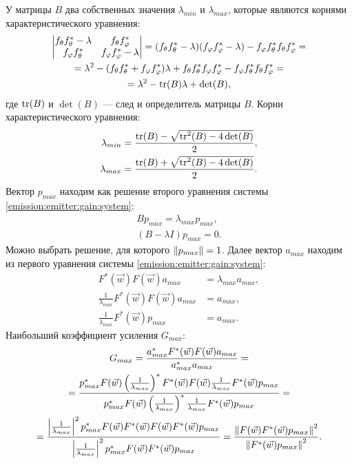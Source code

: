 У матрицы $B$ два собственных значения $\lambda_{min}$ и $\lambda_{max}$, которые являются корнями характеристического уравнения:
\begin{multline*}
    \begin{vmatrix}
        f_\theta f_\theta^* - \lambda & f_{\theta} f_\varphi^*          \\
        f_\varphi f_\theta^*          & f_\varphi f_\varphi^* - \lambda
    \end{vmatrix}
    = (f_\theta f_\theta^* - \lambda) (f_\varphi f_\varphi^* - \lambda) - f_\varphi f_\theta^* f_{\theta} f_\varphi^* = \\
    = \lambda^2 - ( f_\theta f_\theta^* + f_\varphi f_\varphi^* ) \lambda + f_\theta f_\theta^* f_\varphi f_\varphi^* - f_\varphi f_\theta^* f_{\theta} f_\varphi^* = \\
    = \lambda^2 - \operatorname{tr}(B) \lambda + \det(B) ,
\end{multline*}
где $\operatorname{tr}(B)$ и $\det(B)$ --- след и определитель матрицы $B$. Корни характеристического уравнения:
\begin{align}
    \lambda_{min} & = \frac{\operatorname{tr}(B) - \sqrt{\operatorname{tr}^2(B) - 4 \det(B)}}{2} \label{emission:emitter:gain:minimum_eigenvalue} , \\
    \lambda_{max} & = \frac{\operatorname{tr}(B) + \sqrt{\operatorname{tr}^2(B) - 4 \det(B)}}{2} \label{emission:emitter:gain:maximum_eigenvalue}.
\end{align}
Вектор $p_{max}$ находим как решение второго уравнения системы \eqref{emission:emitter:gain:system}:
\begin{gather*}
    B p_{max} = \lambda_{max} p_{max} , \\
    ( B - \lambda I ) p_{max} = 0 .
\end{gather*}
Можно выбрать решение, для которого $\left \| p_{max} \right \| = 1$. Далее вектор $a_{max}$ находим из первого уравнения системы \eqref{emission:emitter:gain:system}:
\begin{align*}
    F^*(\vec{w}) F(\vec{w}) a_{max}                         & = \lambda_{max} a_{max} , \\
    \frac{1}{\lambda_{max}} F^*(\vec{w}) F(\vec{w}) a_{max} & = a_{max} , \\
    \frac{1}{\lambda_{max}} F^*(\vec{w}) p_{max}            & = a_{max} .
\end{align*}
Наибольший коэффициент усиления $G_{max}$:
\begin{multline*}
    G_{max}
    = \frac{a_{max}^* F^*(\vec{w}) F(\vec{w}) a_{max}}{a_{max}^* a_{max}} = \\
    = \frac{p_{max}^* F(\vec{w}) \left ( \frac{1}{\lambda_{max}} \right )^* F^*(\vec{w}) F(\vec{w}) \frac{1}{\lambda_{max}} F^*(\vec{w}) p_{max}}{ p_{max}^* F(\vec{w}) \left ( \frac{1}{\lambda_{max}} \right )^* \frac{1}{\lambda_{max}} F^*(\vec{w}) p_{max}} = \\
    = \frac{\left | \frac{1}{\lambda_{max}} \right |^2 p_{max}^* F(\vec{w}) F^*(\vec{w}) F(\vec{w}) F^*(\vec{w}) p_{max}}{ \left | \frac{1}{\lambda_{max}} \right |^2 p_{max}^* F(\vec{w}) F^*(\vec{w}) p_{max}}
    = \frac{\left \| F(\vec{w}) F^*(\vec{w}) p_{max} \right \|^2}{ \left \| F^*(\vec{w}) p_{max} \right \|^2} .
\end{multline*}


